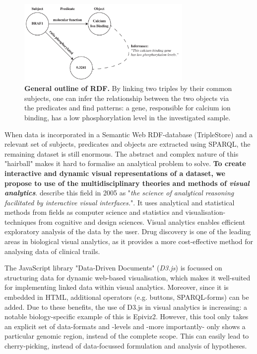 \documentclass[twoside,fontsize=10pt]{article}
\begin{document}
\medskip
\begin{figure}[H]
    \centering
    \includegraphics[width=0.75\textwidth]{rdf}
    \caption{\textbf{General outline of RDF.} By linking two triples by their common subjects, one can infer the relationship between the two objects via the predicates and find patterns: a gene, responsible for calcium ion binding, has a low phosphorylation level in the investigated sample.}
    \label{fig:rdf}
\end{figure}
\noindent
When data is incorporated in a Semantic Web RDF-database (TripleStore) and a relevant set of subjects, predicates and objects are extracted using SPARQL, the remaining dataset is still enormous. The abstract and complex nature of this "hairball" makes it hard to formalise an analytical problem to solve. \textbf{To create interactive and dynamic visual representations of a dataset, we propose to use of the multidisciplinary theories and methods of \textit{visual analytics}}. \citet{Thomas2005} describe this field in 2005 as "\textit{the science of analytical reasoning facilitated by interactive visual interfaces.}". It uses analytical and statistical methods from fields as computer science and statistics and visualisation-techniques from cognitive and design sciences. Visual analytics enables efficient exploratory analysis of the data by the user. Drug discovery is one of the leading areas in biological visual analytics, as it provides a more cost-effective method for analysing data of clinical trails\cite{Cao2008}.

The JavaScript library "Data-Driven Documents" (\textit{D3.js}) is focussed on structuring data for dynamic web-based visualisation, which makes it well-suited for implementing linked data within visual analytics\cite{Bostock2011}. Moreover, since it is embedded in HTML, additional operators (e.g. buttons, SPARQL-forms) can be added. Due to these benefits, the use of D3.js in visual analytics is increasing: a notable biology-specific example of this is Epiviz2\cite{Chelaru2014}. However, this tool only takes an explicit set of data-formats and -levels and -more importantly- only shows a particular genomic region, instead of the complete scope. This can easily lead to cherry-picking, instead of data-focussed formulation and analysis of hypotheses.
\medskip
\end{document}
